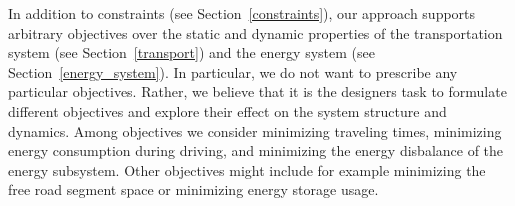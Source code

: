 In addition to constraints (see Section~\ref{constraints}), our approach supports arbitrary objectives over the static and dynamic properties of the transportation system (see Section~\ref{transport}) and the energy system (see Section~\ref{energy_system}). In particular, we do not want to prescribe any particular objectives. Rather, we believe that it is the designers task to formulate different objectives and explore their effect on the system structure and dynamics. 
Among objectives we consider minimizing traveling times, minimizing energy consumption during driving, and minimizing the energy disbalance of the energy subsystem. Other objectives might include for example minimizing the free road segment space or minimizing energy storage usage.